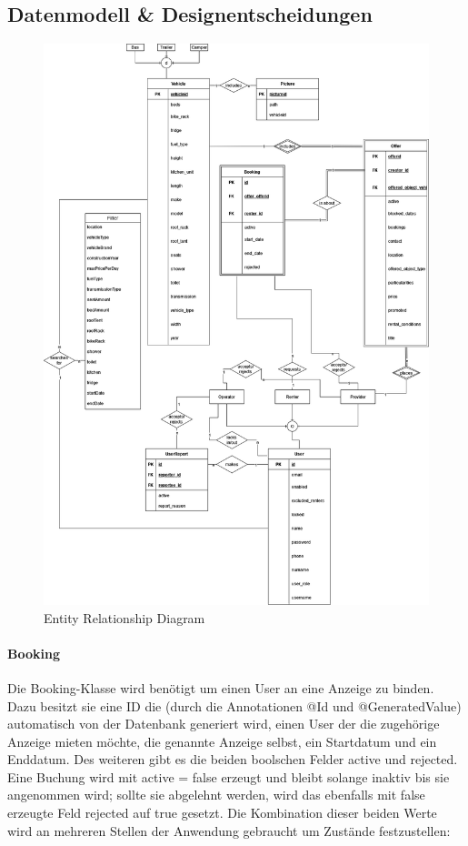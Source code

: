 \subsection{Datenmodell \& Designentscheidungen}
\begin{figure}[h]
	\centering
	\includegraphics[width=15cm]{resources/images/ER-diagram.drawio.png}
	\caption{Entity Relationship Diagram}
	\label{fig:er-diagram}
\end{figure}

\paragraph{Booking}
Die Booking-Klasse wird benötigt um einen User an eine Anzeige zu binden. Dazu besitzt sie eine ID die (durch die Annotationen @Id und @GeneratedValue) automatisch von der Datenbank generiert wird, einen User der die zugehörige Anzeige mieten möchte, die genannte Anzeige selbst, ein Startdatum und ein Enddatum. Des weiteren gibt es die beiden boolschen Felder active und rejected. Eine Buchung wird mit active = false erzeugt und bleibt solange inaktiv bis sie angenommen wird; sollte sie abgelehnt werden, wird das ebenfalls mit false erzeugte Feld rejected auf true gesetzt. Die Kombination dieser beiden Werte wird an mehreren Stellen der Anwendung gebraucht um Zustände festzustellen:

